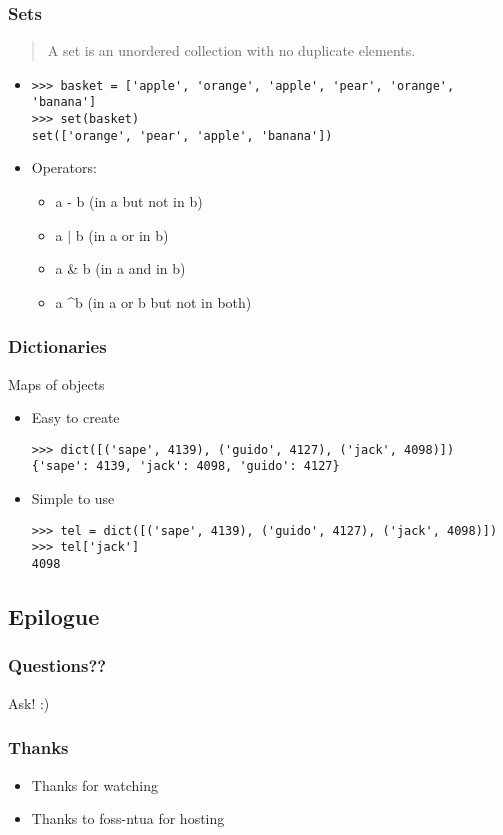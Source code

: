 \documentclass{beamer}
\begin{document}
\begin{frame}[fragile]
    \frametitle{Sets}
    \begin{quote}
        A set is an unordered collection with no duplicate elements. 
    \end{quote}
    \begin{itemize}
        \item<2-> \begin{verbatim}
>>> basket = ['apple', 'orange', 'apple', 'pear', 'orange', 'banana']
>>> set(basket)
set(['orange', 'pear', 'apple', 'banana'])
            \end{verbatim}
        \item<3-> Operators: 
            \begin{itemize}
                \item<4-> a - b (in a but not in b)
                \item<5-> a $\vert$ b (in a or in b)
                \item<6-> a \& b (in a and in b)
                \item<7-> a \textasciicircum  b (in a or b but not in both)
            \end{itemize}
    \end{itemize}
\end{frame}

\begin{frame}[fragile]
    \frametitle{Dictionaries}
    Maps of objects
    \begin{itemize}
        \item<2-> Easy to create \begin{verbatim}
>>> dict([('sape', 4139), ('guido', 4127), ('jack', 4098)])
{'sape': 4139, 'jack': 4098, 'guido': 4127}
            \end{verbatim}
        \item<3-> Simple to use \begin{verbatim}
>>> tel = dict([('sape', 4139), ('guido', 4127), ('jack', 4098)])
>>> tel['jack']
4098
            \end{verbatim}
    \end{itemize}
\end{frame}

\subsection{Epilogue}
\begin{frame}
    \frametitle{Questions??}
    Ask! :)
\end{frame}

\begin{frame}[fragile]
    \frametitle{Thanks}
    \begin{itemize}
        \item Thanks for watching
        \item Thanks to foss-ntua for hosting
    \end{itemize}
\end{frame}
\end{document}
